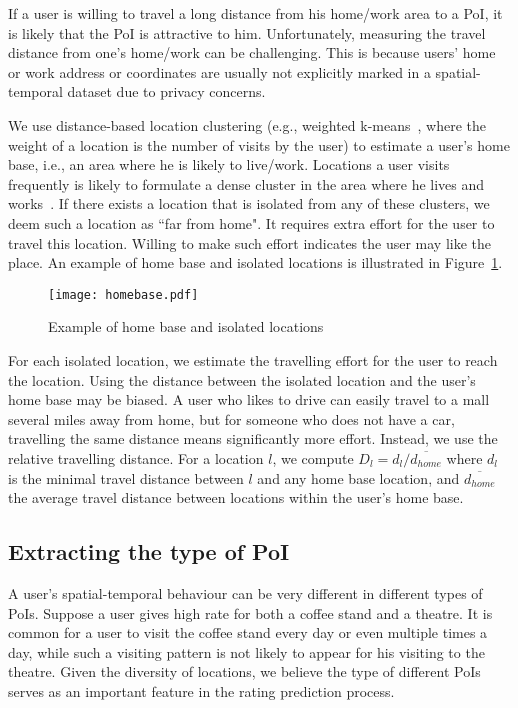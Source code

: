 If a user is willing to travel a long distance from his home/work area to a PoI, it is likely that the PoI is attractive to him. Unfortunately, measuring the travel distance from one's home/work can be challenging. This is because users' home or work address or coordinates are usually not explicitly marked in a spatial-temporal dataset due to privacy concerns.

We use distance-based location clustering (e.g., weighted k-means~\cite{kerdprasop2005weighted}, where the weight of a location is the number of visits by the user) to estimate a user's home base, i.e., an area where he is likely to live/work. Locations a user visits frequently is likely to formulate a dense cluster in the area where he lives and works~\cite{golle2009anonymity, zang2011anonymization}. If there exists a location that is isolated from any of these clusters, we deem such a location as ``far from home". It requires extra effort for the user to travel this location. Willing to make such effort indicates the user may like the place. An example of home base and isolated locations is illustrated in Figure~\ref{example}.

\begin{figure}[htb]
\center
{\texttt{[image: homebase.pdf]}}
\caption{Example of home base and isolated locations} 
\label{example}
\end{figure}

For each isolated location, we estimate the travelling effort for the user to reach the location. Using the distance between the isolated location and the user's home base may be biased. A user who likes to drive can easily travel to a mall several miles away from home, but for someone who does not have a car, travelling the same distance means significantly more effort. Instead, we use the relative travelling distance. For a location $l$, we compute $D_l = d_l / \overline{d_{home}}$ where $d_l$ is the minimal travel distance between $l$ and any home base location, and $\overline{d_{home}}$ the average travel distance between locations within the user's home base.

\subsection{Extracting the type of PoI}

A user's spatial-temporal behaviour can be very different in different types of PoIs. Suppose a user gives high rate for both a coffee stand and a theatre. It is common for a user to visit the coffee stand every day or even multiple times a day, while such a visiting pattern is not likely to appear for his visiting to the theatre. Given the diversity of locations, we believe the type of different PoIs serves as an important feature in the rating prediction process.

